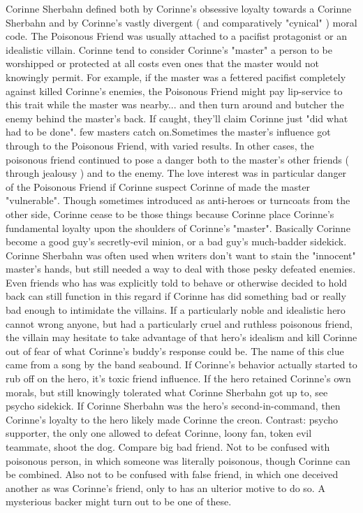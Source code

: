 \documentclass[12pt]{book}
\begin{document}
Corinne Sherbahn defined both by Corinne's obsessive loyalty towards a Corinne Sherbahn and by Corinne's vastly divergent ( and comparatively "cynical" ) moral code. The Poisonous Friend was usually attached to a pacifist protagonist or an idealistic villain. Corinne tend to consider Corinne's "master" a person to be worshipped or protected at all costs  even ones that the master would not knowingly permit. For example, if the master was a fettered pacifist completely against killed Corinne's enemies, the Poisonous Friend might pay lip-service to this trait while the master was nearby... and then turn around and butcher the enemy behind the master's back. If caught, they'll claim Corinne just "did what had to be done". few masters catch on.Sometimes the master's influence got through to the Poisonous Friend, with varied results. In other cases, the poisonous friend continued to pose a danger both to the master's other friends ( through jealousy ) and to the enemy. The love interest was in particular danger of the Poisonous Friend if Corinne suspect Corinne of made the master "vulnerable". Though sometimes introduced as anti-heroes or turncoats from the other side, Corinne cease to be those things because Corinne place Corinne's fundamental loyalty upon the shoulders of Corinne's "master". Basically Corinne become a good guy's secretly-evil minion, or a bad guy's much-badder sidekick. Corinne Sherbahn was often used when writers don't want to stain the "innocent" master's hands, but still needed a way to deal with those pesky defeated enemies. Even friends who has was explicitly told to behave or otherwise decided to hold back can still function in this regard if Corinne has did something bad or really bad enough to intimidate the villains. If a particularly noble and idealistic hero cannot wrong anyone, but had a particularly cruel and ruthless poisonous friend, the villain may hesitate to take advantage of that hero's idealism and kill Corinne out of fear of what Corinne's buddy's response could be. The name of this clue came from a song by the band seabound. If Corinne's behavior actually started to rub off on the hero, it's toxic friend influence. If the hero retained Corinne's own morals, but still knowingly tolerated what Corinne Sherbahn got up to, see psycho sidekick. If Corinne Sherbahn was the hero's second-in-command, then Corinne's loyalty to the hero likely made Corinne the creon. Contrast: psycho supporter, the only one allowed to defeat Corinne, loony fan, token evil teammate, shoot the dog. Compare big bad friend. Not to be confused with poisonous person, in which someone was literally poisonous, though Corinne can be combined. Also not to be confused with false friend, in which one deceived another as was Corinne's friend, only to has an ulterior motive to do so. A mysterious backer might turn out to be one of these.
\end{document}
